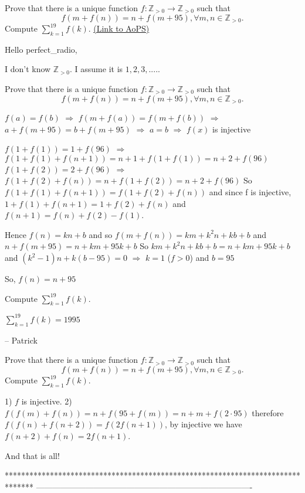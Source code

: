 \begin{problem}
	Prove that there is a unique function $f : \mathbb Z_{>0}\to \mathbb Z_{>0}$ such that \[f \left( m+f(n) \right) = n+f \left( m+95 \right), \forall m, n \in \mathbb Z_{>0}.\]
Compute $\sum_{k=1}^{19}f(k)$.
	\flushright \href{https://artofproblemsolving.com/community/c6h148143}{(Link to AoPS)}
\end{problem}



\begin{mysolution}
	Hello perfect\_radio,

I don't know $\mathbb Z_{>0}$. I assume it is ${1,2,3, ....}$.

 \begin{tcolorbox}Prove that there is a unique function $f : \mathbb Z_{>0}\to \mathbb Z_{>0}$ such that
\[f \left( m+f(n) \right) = n+f \left( m+95 \right), \forall m, n \in \mathbb Z_{>0}. \]
\end{tcolorbox}

$f(a)=f(b)$ $\Rightarrow $ $f(m+f(a))=f(m+f(b))$ $\Rightarrow $ $a+f(m+95)=b+f(m+95)$ $\Rightarrow $ $a=b$ $\Rightarrow $ $f(x)$ is injective

$f(1+f(1))=1+f(96)$ $\Rightarrow $ $f(1+f(1)+f(n+1))=n+1+f(1+f(1))=n+2+f(96)$
$f(1+f(2))=2+f(96)$ $\Rightarrow $ $f(1+f(2)+f(n))=n+f(1+f(2))=n+2+f(96)$
So $f(1+f(1)+f(n+1))=f(1+f(2)+f(n))$ and since f is injective, $1+f(1)+f(n+1)=1+f(2)+f(n)$ and $f(n+1)=f(n)+f(2)-f(1)$.

Hence $f(n)=kn+b$ and so $f(m+f(n))=km+k^{2}n+kb+b$ and $n+f(m+95)=n+km+95k+b$
So $km+k^{2}n+kb+b=n+km+95k+b$ and $(k^{2}-1)n+k(b-95)=0$ $\Rightarrow $ $k=1$ ($f>0$) and $b=95$

So, $f(n)=n+95$

 \begin{tcolorbox}Compute $\sum_{k=1}^{19}f(k)$.\end{tcolorbox}
$\sum_{k=1}^{19}f(k)=1995$

-- 
Patrick
\end{mysolution}



\begin{mysolution}
	\begin{tcolorbox}Prove that there is a unique function $f : \mathbb Z_{>0}\to \mathbb Z_{>0}$ such that
\[f \left( m+f(n) \right) = n+f \left( m+95 \right), \forall m, n \in \mathbb Z_{>0}. \]
Compute $\sum_{k=1}^{19}f(k)$.\end{tcolorbox}
1) $f$ is injective.
2) $f(f(m)+f(n))=n+f(95+f(m))=n+m+f(2\cdot 95)$ therefore $f(f(n)+f(n+2))=f(2f(n+1))$, by injective we have $f(n+2)+f(n)=2f(n+1)$.

And that is all!
\end{mysolution}
*******************************************************************************
-------------------------------------------------------------------------------

